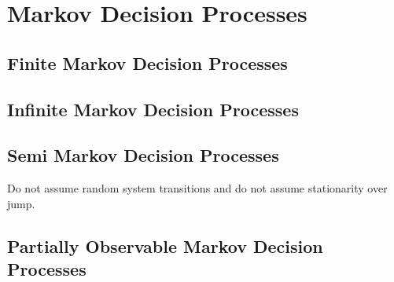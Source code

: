 %
%

\section{Markov Decision Processes}

\subsection{Finite Markov Decision Processes}
\subsection{Infinite Markov Decision Processes}
\subsection{Semi Markov Decision Processes}
Do not assume random system transitions and do not assume stationarity over jump.
\subsection{Partially Observable Markov Decision Processes}
